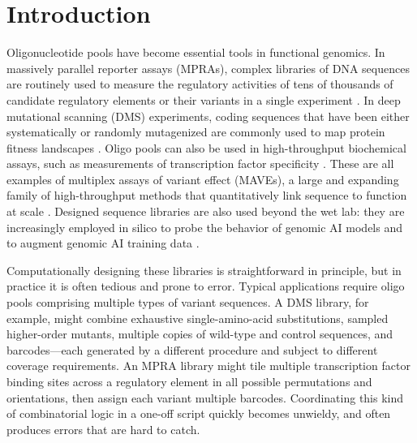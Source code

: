 \documentclass[twoside]{kinneylab_preprintstyle}
\begin{document}
\maketitle

\section*{Introduction}

Oligonucleotide pools have become essential tools in functional genomics. In massively parallel reporter assays (MPRAs), complex libraries of DNA sequences are routinely used to measure the regulatory activities of tens of thousands of candidate regulatory elements or their variants in a single experiment \citep{Patwardhan2009cw, Kinney2010tn, Melnikov2012dw, Kwasnieski2012hu, Sharon2012io, Mogno2013cf, Levo2014hl, Inoue2015cs, Vvedenskaya2015ih, Urtecho2018hu, Klein2020, Romero2023, LaFleur2024aa}. In deep mutational scanning (DMS) experiments, coding sequences that have been either systematically or randomly mutagenized are commonly used to map protein fitness landscapes \citep{Fowler2010gt, Hietpas2011bp, Fowler2014gq, Olson2014iq, Adams2016dka, Findlay2018kd, Starr2020aa}. Oligo pools can also be used in high-throughput biochemical assays, such as measurements of transcription factor specificity \citep{Berger2006wp, Maerkl2007tv, Noyes2008vr, Gordan2013, Le2018cr, Shen2018ip, Khetan2025_paditseq}. These are all examples of multiplex assays of variant effect (MAVEs), a large and expanding family of high-throughput methods that quantitatively link sequence to function at scale \citep{Kinney2019jc, Starita2017ec, Weile2018gm}. Designed sequence libraries are also used beyond the wet lab: they are increasingly employed in silico to probe the behavior of genomic AI models \citep{Avsec2021bpnet, Toneyan2024creme, Seitz2024squid, Seitz2025, Nagai2026review} and to augment genomic AI training data \citep{Lee2023}.

Computationally designing these libraries is straightforward in principle, but in practice it is often tedious and prone to error. Typical applications require oligo pools comprising multiple types of variant sequences. A DMS library, for example, might combine exhaustive single-amino-acid substitutions, sampled higher-order mutants, multiple copies of wild-type and control sequences, and barcodes---each generated by a different procedure and subject to different coverage requirements. An MPRA library might tile multiple transcription factor binding sites across a regulatory element in all possible permutations and orientations, then assign each variant multiple barcodes. Coordinating this kind of combinatorial logic in a one-off script quickly becomes unwieldy, and often produces errors that are hard to catch.
\end{document}
